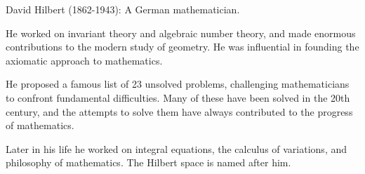 David Hilbert (1862-1943): A German mathematician. 
\par
He worked on invariant theory and algebraic number theory, and made enormous 
contributions to the modern study of geometry. He was influential in founding
the axiomatic approach to mathematics.
\par
He proposed a famous list of 23 unsolved problems, challenging mathematicians
to confront fundamental difficulties. Many of these have been solved in the 20th
century, and the attempts to solve them have always contributed to the progress
of mathematics.
\par
Later in his life he worked on integral equations, the calculus of variations, and philosophy of mathematics.
The Hilbert space is named after him.